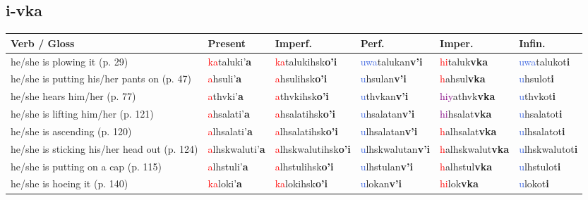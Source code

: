 \documentclass[oneside,openany]{book}%
\begin{document}
\subsection*{i-vka}%
\begin{tabularx}{\textwidth}{>{\hsize=1.5\hsize\RaggedRight}X >{\hsize=0.9\hsize}X >{\hsize=0.9\hsize}X >{\hsize=0.9\hsize}X >{\hsize=0.9\hsize}X >{\hsize=0.9\hsize}X}%
\toprule%
\textbf{Verb / Gloss}&\textbf{Present}&\textbf{Imperf.}&\textbf{Perf.}&\textbf{Imper.}&\textbf{Infin.}\\%
\midrule%
he/she is plowing it (p. 29)&\textcolor{Red}{ka}taluki'\textbf{a}&\textcolor{Red}{ka}talukihsk\textbf{o'i}&\textcolor{RoyalBlue}{uwa}talukan\textbf{v'i}&\textcolor{Red}{hi}taluk\textbf{vka}&\textcolor{RoyalBlue}{uwa}talukot\textbf{i}\\%
he/she is putting his/her pants on (p. 47)&\textcolor{Red}{a}hsuli'\textbf{a}&\textcolor{Red}{a}hsulihsk\textbf{o'i}&\textcolor{RoyalBlue}{u}hsulan\textbf{v'i}&\textcolor{Red}{h}ahsul\textbf{vka}&\textcolor{RoyalBlue}{u}hsulot\textbf{i}\\%
he/she hears him/her (p. 77)&\textcolor{Red}{a}thvki'\textbf{a}&\textcolor{Red}{a}thvkihsk\textbf{o'i}&\textcolor{RoyalBlue}{u}thvkan\textbf{v'i}&\textcolor{Purple}{hiy}athvk\textbf{vka}&\textcolor{RoyalBlue}{u}thvkot\textbf{i}\\%
he/she is lifting him/her (p. 121)&\textcolor{Red}{a}hsalati'\textbf{a}&\textcolor{Red}{a}hsalatihsk\textbf{o'i}&\textcolor{RoyalBlue}{u}hsalatan\textbf{v'i}&\textcolor{Purple}{hi}hsalat\textbf{vka}&\textcolor{RoyalBlue}{u}hsalatot\textbf{i}\\%
he/she is ascending (p. 120)&\textcolor{Red}{a}lhsalati'\textbf{a}&\textcolor{Red}{a}lhsalatihsk\textbf{o'i}&\textcolor{RoyalBlue}{u}lhsalatan\textbf{v'i}&\textcolor{Red}{h}alhsalat\textbf{vka}&\textcolor{RoyalBlue}{u}lhsalatot\textbf{i}\\%
he/she is sticking his/her head out (p. 124)&\textcolor{Red}{a}lhskwaluti'\textbf{a}&\textcolor{Red}{a}lhskwalutihsk\textbf{o'i}&\textcolor{RoyalBlue}{u}lhskwalutan\textbf{v'i}&\textcolor{Red}{h}alhskwalut\textbf{vka}&\textcolor{RoyalBlue}{u}lhskwalutot\textbf{i}\\%
he/she is putting on a cap (p. 115)&\textcolor{Red}{a}lhstuli'\textbf{a}&\textcolor{Red}{a}lhstulihsk\textbf{o'i}&\textcolor{RoyalBlue}{u}lhstulan\textbf{v'i}&\textcolor{Red}{h}alhstul\textbf{vka}&\textcolor{RoyalBlue}{u}lhstulot\textbf{i}\\%
he/she is hoeing it (p. 140)&\textcolor{Red}{ka}loki'\textbf{a}&\textcolor{Red}{ka}lokihsk\textbf{o'i}&\textcolor{RoyalBlue}{u}lokan\textbf{v'i}&\textcolor{Red}{hi}lok\textbf{vka}&\textcolor{RoyalBlue}{u}lokot\textbf{i}\\%

\end{tabularx}
\end{document}
